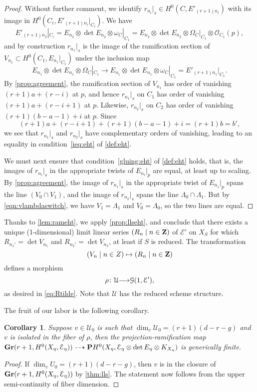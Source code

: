 \documentclass[11pt,reqno]{amsart}
\theoremstyle{plain}
\newtheorem{corollary}[theorem]{Corollary}
\theoremstyle{definition}
\theoremstyle{remark}
\numberwithin{equation}{section}
\renewcommand{\to}{{\longrightarrow}}
\numberwithin{equation}{section}
\renewcommand{\O}{\mathcal O}
\begin{document}
\begin{proof}
  Without further comment, we identify $r_{n_i}|_s \in H^0(C, E'_{(r+1)n_i})$ with its image in $H^0(C_i, E'_{(r+1)n_i}|_{C_i})$.
  We have
  \[E'_{(r+1)n_2}|_{C_i} = E_{n_2} \otimes \det E_{n_2} \otimes \omega_C|_{C_1} = E_{n_2} \otimes \det E_{n_2} \otimes \Omega_C|_{C_1} \otimes \O_{C_1}(p),\]
  and by construction $r_{n_1}|_s$ is the image of the ramification section of $V_{n_1} \subset H^0(C_1, E_{n_1}|_{C_1})$ under the inclusion map
  \[ E_{n_1} \otimes \det E_{n_1} \otimes \Omega_C|_{C_1} \to E_{n_1} \otimes \det E_{n_1} \otimes \omega_C|_{C_1} = E'_{(r+1)n_1}|_{C_1}.\]
  By \autoref{prop:agreement}, the ramification section of $V_{n_1}$ has order of vanishing $(r+1)a+(r-i)$ at $p$, and hence $r_{n_1}|_s$ on $C_1$ has order of vanishing $(r+1)a+(r-i+1)$ at $p$.
  Likewise, $r_{n_2}|_s$ on $C_2$ has order of vanishing $(r+1)(b-a-1)+i$ at $p$.
  Since
  \[ (r+1)a+(r-i+1) + (r+1)(b-a-1) + i = (r+1)b = b',\]
  we see that $r_{n_1}|_s$ and $r_{n_2}|_s$ have complementary orders of vanishing, leading to an equality in condition~\eqref{ieq:eht} of \autoref{def:eht}.

  We must next ensure that condition~\eqref{gluing:eht} of \autoref{def:eht} holds, that is, the images of $r_{n_i}|_s$ in the appropriate twists of $E_{n_i}|_p$ are equal, at least up to scaling.
  By \autoref{prop:agreement}, the image of $r_{n_1}|_s$ in the appropriate twist of $E_{n_1}|_p$ spans the line $(V_0 \cap V_1)$, and the image of $r_{n_2}|_s$ spans the line $\Lambda_0 \cap \Lambda_1$.
  But by \eqref{eqn:vlambdaswitch}, we have $V_1 = \Lambda_1$ and $V_0 = \Lambda_0$, so the two lines are equal.
\end{proof}

Thanks to \autoref{lem:rameht}, we apply \autoref{prop:llseht}, and conclude that there exists a unique (1-dimensional) limit linear series $(R_n \mid n \in {\bf Z})$ of $\mathcal E'$ on $X_S$ for which $R_{n_1'} = \det V_{n_1}$ and $R_{n_2'} = \det V_{n_2}$, at least if $S$ is reduced.
The transformation
\[ (V_n \mid n \in Z) \mapsto (R_n \mid n \in {\bf Z})\]
defines a morphism
\begin{equation}\label{prop:mapreduced}
  \rho \from \mathcal U \to \mathcal G(1, \mathcal E'),
\end{equation}
as desired in \eqref{eq:Rtilde}.
Note that $\mathcal U$ has the reduced scheme structure.

The fruit of our labor is the following corollary.
\begin{corollary}\label{prop:degeneration}
  Suppose $v \in \mathcal U_0$ is such that $\dim_v \mathcal U_0 = (r+1)(d-r-g)$ and $v$ is isolated in the fiber of $\rho$, then the projection-ramification map ${\bf Gr}(r+1, H^0(X_\eta, \mathcal E_\eta)) \dashrightarrow {\bf P} H^0(X_\eta, \mathcal E_\eta \otimes \det E_\eta \otimes K_{X_\eta})$ is generically finite.
\end{corollary}
\begin{proof}
  If $\dim_v U_0 = (r+1)(d-r-g)$, then $v$ is in the closure of ${\bf Gr}(r+1, H^0(X_\eta, \mathcal E_\eta))$ by \autoref{thm:lls}.
  The statement now follows from the upper semi-continuity of fiber dimension.
\end{proof}
\end{document}
